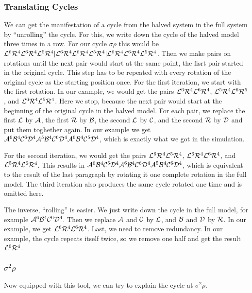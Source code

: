 \subsubsection{Translating Cycles}

We can get the manifestation of a cycle from the halved system in the full system by ``unrolling'' the cycle.
For this, we write down the cycle of the halved model three times in a row.
For our cycle $\sigma\rho$ this would be $\mathcal{L}^6\mathcal{R}^4\mathcal{L}^6\mathcal{R}^4\mathcal{L}^5\mathcal{R}^4|\mathcal{L}^6\mathcal{R}^4\mathcal{L}^6\mathcal{R}^4\mathcal{L}^5\mathcal{R}^4|\mathcal{L}^6\mathcal{R}^4\mathcal{L}^6\mathcal{R}^4\mathcal{L}^5\mathcal{R}^4$.
Then we make pairs on rotations until the next pair would start at the same point, the fisrt pair started in the original cycle.
This step has to be repeated with every rotation of the original cycle as the starting position once.
For the first iteration, we start with the first rotation.
In our example, we would get the pairs $\mathcal{L}^6\mathcal{R}^4\mathcal{L}^6\mathcal{R}^4$, $\mathcal{L}^5\mathcal{R}^4\mathcal{L}^6\mathcal{R}^5$, and $\mathcal{L}^6\mathcal{R}^4\mathcal{L}^5\mathcal{R}^4$.
Here we stop, because the next pair would start at the beginning of the original cycle in the halved model.
For each pair, we replace the first $\mathcal{L}$ by $\mathcal{A}$, the first $\mathcal{R}$ by $\mathcal{B}$, the second $\mathcal{L}$ by $\mathcal{C}$, and the second $\mathcal{R}$ by $\mathcal{D}$ and put them toghether again.
In our example we get $\mathcal{A}^6\mathcal{B}^4\mathcal{C}^6\mathcal{D}^4\mathcal{A}^5\mathcal{B}^4\mathcal{C}^6\mathcal{D}^4\mathcal{A}^6\mathcal{B}^4\mathcal{C}^5\mathcal{D}^4$, which is exactly what we got in the simulation.

For the second iteration, we would get the pairs $\mathcal{L}^6\mathcal{R}^4\mathcal{L}^5\mathcal{R}^4$, $\mathcal{L}^6\mathcal{R}^4\mathcal{L}^6\mathcal{R}^4$, and $\mathcal{L}^5\mathcal{R}^4\mathcal{L}^6\mathcal{R}^4$.
This results in $\mathcal{A}^6\mathcal{B}^4\mathcal{C}^5\mathcal{D}^4\mathcal{A}^6\mathcal{B}^4\mathcal{C}^6\mathcal{D}^4\mathcal{A}^5\mathcal{B}^4\mathcal{C}^6\mathcal{D}^4$, which is equivalent to the result of the last paragraph by rotating it one complete rotation in the full model.
The third iteration also produces the same cycle rotated one time and is omitted here.

The inverse, ``rolling'' is easier.
We just write down the cycle in the full model, for example $\mathcal{A}^6\mathcal{B}^4\mathcal{C}^6\mathcal{D}^4$.
Then we replace $\mathcal{A}$ and $\mathcal{C}$ by $\mathcal{L}$, and $\mathcal{B}$ and $\mathcal{D}$ by $\mathcal{R}$.
In our example, we get $\mathcal{L}^6\mathcal{R}^4\mathcal{L}^6\mathcal{R}^4$.
Last, we need to remove redundancy.
In our example, the cycle repeats itself twice, so we remove one half and get the result $\mathcal{L}^6\mathcal{R}^4$.

\subsubsection{$\sigma^2\rho$}

Now equipped with this tool, we can try to explain the cycle at $\sigma^2\rho$.
